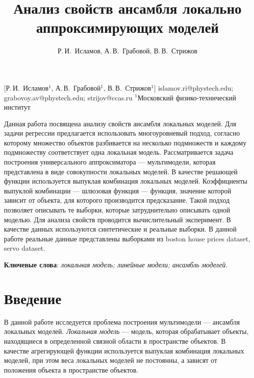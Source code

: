\documentclass[12pt, twoside]{article}
\begin{document}
\title
    [Анализ свойств ансамбля локально аппроксимирующих моделей] %
    {Анализ свойств ансамбля локально аппроксимирующих моделей}
\author
    [Р.\,И.~Исламов, А.\,В.~Грабовой, В.\,В.~Стрижов] %
    {Р.\,И.~Исламов, А.\,В.~Грабовой, В.\,В.~Стрижов} %
    [Р.\,И.~Исламов$^1$, А.\,В.~Грабовой$^1$, В.\,В.~Стрижов$^{1}$] %
\email
    {islamov.ri@phystech.edu; grabovoy.av@phystech.edu;  strijov@ccas.ru}
\organization
    {$^1$Московский физико-технический институт}
\abstract
    {Данная работа посвящена анализу свойств ансамбля локальных моделей. Для задачи регрессии  предлагается использовать многоуровневый подход, согласно которому множество объектов разбивается на несколько подмножеств и каждому подмножеству соответствует одна локальная модель. Рассматривается задача построения универсального аппроксиматора --- мультимодели, которая представлена в виде совокупности локальных моделей. В качестве решающей функции используется выпуклая комбинация локальных моделей.  Коэффициенты выпуклой комбинации --- шлюзовая функция --- функция, значение которой зависит от объекта, для которого производится предсказание. Такой подход позволяет описывать те выборки, которые затруднительно описывать одной моделью. Для анализа свойств проводится вычислительный эксперимент. В качестве данных используются синтетические и реальные выборки. В данной работе реальные данные представлены выборками из boston house prices dataset, servo dataset.  
	
\bigskip
\noindent
\textbf{Ключевые слова}: \emph {локальная модель; линейные модели; ансамбль моделей.}
}

\maketitle
\linenumbers

\section{Введение}
В данной работе исследуется проблема построения мультимодели --- ансамбля локальных моделей. \textit{Локальная модель} --- модель, которая обрабатывает объекты, находящиеся в определенной связной области в пространстве объектов. В качестве агрегирующей функции используется выпуклая комбинация локальных моделей, при этом веса локальных моделей не постоянны, а зависят от положения объекта в пространстве объектов. 
\end{document}
